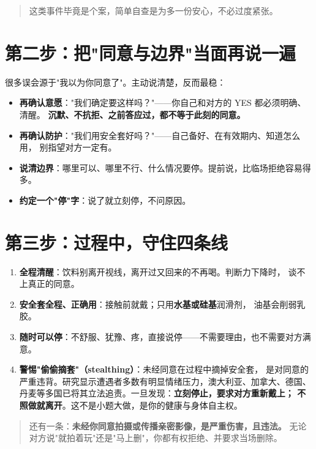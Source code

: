\documentclass[12pt,UTF8,openany]{ctexbook}
\begin{document}
\begin{quote}
这类事件毕竟是个案，简单自查是为多一份安心，不必过度紧张。
\end{quote}

\section{第二步：把"同意与边界"当面再说一遍}

很多误会源于"我以为你同意了"。主动说清楚，反而最稳：

\begin{itemize}[leftmargin=2em]
  \item \textbf{再确认意愿}："我们确定要这样吗？"——你自己和对方的 YES 都必须明确、清醒。
        \textbf{沉默、不抗拒、之前答应过，都不等于此刻的同意。}
  \item \textbf{再确认防护}："我们用安全套好吗？"——自己备好、在有效期内、知道怎么用，
        别指望对方一定有。
  \item \textbf{说清边界}：哪里可以、哪里不行、什么情况要停。提前说，比临场拒绝容易得多。
  \item \textbf{约定一个"停"字}：说了就立刻停，不问原因。
\end{itemize}

\section{第三步：过程中，守住四条线}

\begin{enumerate}[leftmargin=2em,itemsep=0.3em]
  \item \textbf{全程清醒}：饮料别离开视线，离开过又回来的不再喝。判断力下降时，
        谈不上真正的同意。
  \item \textbf{安全套全程、正确用}：接触前就戴；只用\textbf{水基或硅基}润滑剂，
        油基会削弱乳胶。
  \item \textbf{随时可以停}：不舒服、犹豫、疼，直接说停——不需要理由，也不需要对方满意。
  \item \textbf{警惕"偷偷摘套"（stealthing）}：未经同意在过程中摘掉安全套，
        是对同意的严重违背。研究显示遭遇者多数有明显情绪压力，澳大利亚、加拿大、德国、
        丹麦等多国已将其立法追责。一旦发现：\textbf{立刻停止，要求对方重新戴上；
        不照做就离开}。这不是小题大做，是你的健康与身体自主权。
\end{enumerate}

\begin{quote}
还有一条：\textbf{未经你同意拍摄或传播亲密影像，是严重伤害，且违法。}
无论对方说"就拍着玩"还是"马上删"，你都有权拒绝、并要求当场删除。
\end{quote}
\end{document}
